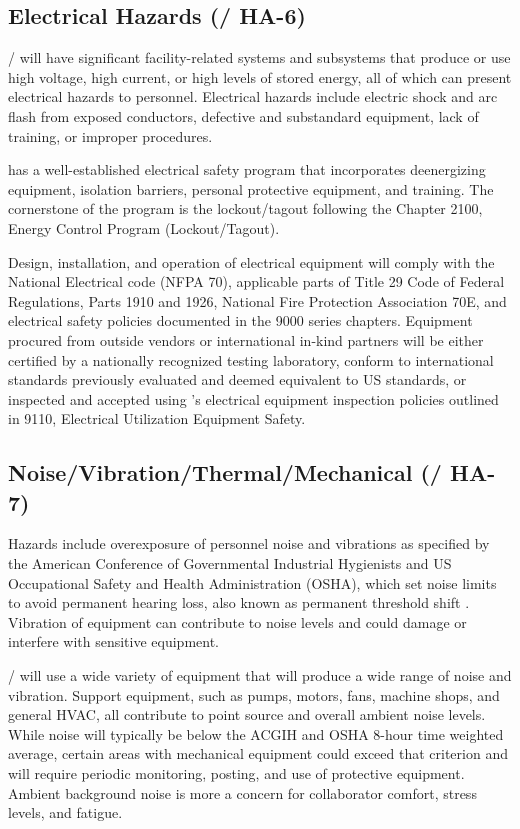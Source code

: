 \subsection{Electrical Hazards (/ HA-6)}

/ will have significant facility-related systems and
subsystems that produce or use high voltage, high current, or high
levels of stored energy, all of which can present electrical hazards
to personnel. Electrical hazards include electric shock and arc flash
from exposed conductors, defective and substandard equipment, lack of
training, or improper procedures.

\fnal has a well-established electrical safety program that
incorporates deenergizing equipment, isolation barriers, personal
protective equipment, and training. The cornerstone of the program is
the lockout/tagout following the 
Chapter 2100, \fnal Energy Control Program (Lockout/Tagout).

Design, installation, and operation of electrical equipment will comply with the National Electrical code (NFPA 70), applicable
parts of Title 29 Code of Federal Regulations, Parts 1910 and 1926,
National Fire Protection Association 70E, and \fnal electrical safety policies documented in the
 9000 series chapters. Equipment procured from outside vendors or
international in-kind partners will be either certified by a
nationally recognized testing laboratory, conform to
international standards previously evaluated and deemed equivalent to
US standards, or inspected and accepted using \fnal's
electrical equipment inspection policies outlined in  9110,
Electrical Utilization Equipment Safety.


\subsection{Noise/Vibration/Thermal/Mechanical (/ HA-7)}

Hazards include overexposure of personnel noise and vibrations as
specified by the American Conference of Governmental Industrial
Hygienists and US Occupational Safety and Health Administration
(OSHA), which set noise limits to avoid permanent hearing loss, also
known as permanent threshold shift . Vibration of equipment can
contribute to noise levels and could damage or interfere with
sensitive equipment.

/ will use a wide variety of equipment that will
produce a wide range of noise and vibration. Support equipment, such
as pumps, motors, fans, machine shops, and general HVAC, all contribute
to point source and overall ambient noise levels. While noise will
typically be below the ACGIH and OSHA 8-hour time weighted average,
certain areas with mechanical equipment could exceed that criterion
and will require periodic monitoring, posting, and use of
protective equipment. Ambient background noise is more a concern for collaborator comfort, stress levels, and fatigue.


